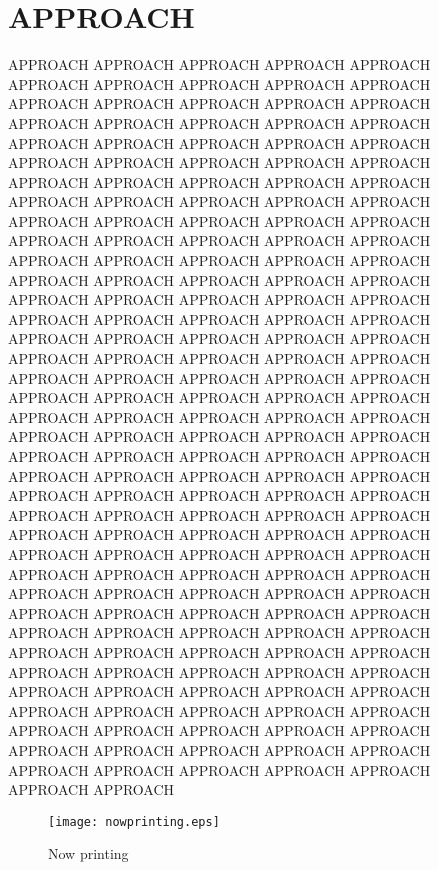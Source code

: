\section{APPROACH}

APPROACH APPROACH APPROACH APPROACH APPROACH APPROACH APPROACH APPROACH APPROACH APPROACH APPROACH
APPROACH APPROACH APPROACH APPROACH APPROACH APPROACH APPROACH APPROACH APPROACH APPROACH APPROACH
APPROACH APPROACH APPROACH APPROACH APPROACH APPROACH APPROACH APPROACH APPROACH APPROACH APPROACH
APPROACH APPROACH APPROACH APPROACH APPROACH APPROACH APPROACH APPROACH APPROACH APPROACH APPROACH
APPROACH APPROACH APPROACH APPROACH APPROACH APPROACH APPROACH APPROACH APPROACH APPROACH APPROACH
APPROACH APPROACH APPROACH APPROACH APPROACH APPROACH APPROACH APPROACH APPROACH APPROACH APPROACH
APPROACH APPROACH APPROACH APPROACH APPROACH APPROACH APPROACH APPROACH APPROACH APPROACH APPROACH
APPROACH APPROACH APPROACH APPROACH APPROACH APPROACH APPROACH APPROACH APPROACH APPROACH APPROACH
APPROACH APPROACH APPROACH APPROACH APPROACH APPROACH APPROACH APPROACH APPROACH APPROACH APPROACH
APPROACH APPROACH APPROACH APPROACH APPROACH APPROACH APPROACH APPROACH APPROACH APPROACH APPROACH
APPROACH APPROACH APPROACH APPROACH APPROACH APPROACH APPROACH APPROACH APPROACH APPROACH APPROACH
APPROACH APPROACH APPROACH APPROACH APPROACH APPROACH APPROACH APPROACH APPROACH APPROACH APPROACH
APPROACH APPROACH APPROACH APPROACH APPROACH APPROACH APPROACH APPROACH APPROACH APPROACH APPROACH
APPROACH APPROACH APPROACH APPROACH APPROACH APPROACH APPROACH APPROACH APPROACH APPROACH APPROACH
APPROACH APPROACH APPROACH APPROACH APPROACH APPROACH APPROACH APPROACH APPROACH APPROACH APPROACH
APPROACH APPROACH APPROACH APPROACH APPROACH APPROACH APPROACH APPROACH APPROACH APPROACH APPROACH
APPROACH APPROACH APPROACH APPROACH APPROACH APPROACH APPROACH APPROACH APPROACH APPROACH APPROACH

\begin{figure}[thpb]
  \centering
  \texttt{[image: nowprinting.eps]}
  \caption{Now printing}
  \label{figure:now_printing}
\end{figure}


